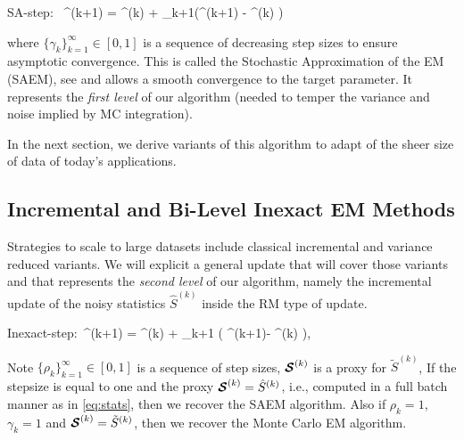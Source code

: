 \documentclass[11pt]{article}
\theoremstyle{t}
\begin{document}
\beq\label{eq:rmstep}
\textsf{SA-step}:~ \hat{\bss}^{(k+1)} =  \hat{\bss}^{(k)}  + \gamma_{k+1}(^{(k+1)} - \hat{\bss}^{(k)} )
\eeq

where $\{ \gamma_{k} \}_{k=1}^\infty \in [0,1]$ is a sequence of decreasing step sizes to ensure asymptotic convergence.
This is called the Stochastic Approximation of the EM (SAEM), see \citep{delyon1999} and allows a smooth convergence to the target parameter.
It represents the \textit{first level} of our algorithm (needed to temper the variance and noise implied by MC integration).

In the next section, we derive variants of this algorithm to adapt of the sheer size of data of today's applications.

\subsection{Incremental and Bi-Level Inexact EM Methods} \label{sec:sEM}
Strategies to scale to large datasets include classical incremental and variance reduced variants.
We will explicit a general update that will cover those variants and that represents the \textit{second level} of our algorithm, namely the incremental update of the noisy statistics $\hat{S}^{(k)}$ inside the RM type of update.

\beq \label{eq:sestep}
\textsf{Inexact-step}:~^{(k+1)} = ^{(k)} + \rho_{k+1} \big( \StocEstep^{(k+1)}- ^{(k)}  \big),
\eeq

Note $\{ \rho_{k} \}_{k=1}^\infty \in [0,1]$ is a sequence of step sizes, $\StocEstep^{(k)}$ is a proxy for $\tilde{S}^{(k)}$,
If the stepsize is equal to one and the proxy $\StocEstep^{(k)} = \hat{S}^{(k)}$, i.e., computed in a full batch manner as in \eqref{eq:stats}, then we recover the SAEM algorithm.
Also if $\rho_{k}=1$, $\gamma_{k}=1$ and $\StocEstep^{(k)} = \tilde{S}^{(k)}$, then we recover the Monte Carlo EM algorithm.
\end{document}
